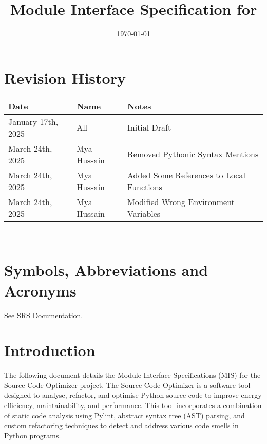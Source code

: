 \documentclass[12pt, titlepage]{article}
\begin{document}
\title{Module Interface Specification for \progname{}}

\author{\authname}

\date{\today}

\maketitle


\section{Revision History}

\begin{tabularx}{\textwidth}{p{3cm}p{2cm}X}
\toprule {\bf Date} & {\bf Name} & {\bf Notes}\\
\midrule
January 17th, 2025 & All & Initial Draft\\
March 24th, 2025 & Mya Hussain & Removed Pythonic Syntax Mentions\\
March 24th, 2025 & Mya Hussain & Added Some References to Local Functions\\
March 24th, 2025 & Mya Hussain & Modified Wrong Environment Variables\\
\bottomrule
\end{tabularx}

~\newpage

\section{Symbols, Abbreviations and Acronyms}

See \href{https://github.com/ssm-lab/capstone--source-code-optimizer/blob/main/docs/SRS/SRS.pdf}{SRS} Documentation.


\newpage

\tableofcontents

\newpage


\section{Introduction}

The following document details the Module Interface Specifications (MIS) for the Source Code Optimizer project. The Source Code Optimizer is a software tool designed to analyse, refactor, and optimise Python source code to improve energy efficiency, maintainability, and performance. This tool incorporates a combination of static code analysis using Pylint, abstract syntax tree (AST) parsing, and custom refactoring techniques to detect and address various code smells in Python programs.
\end{document}
